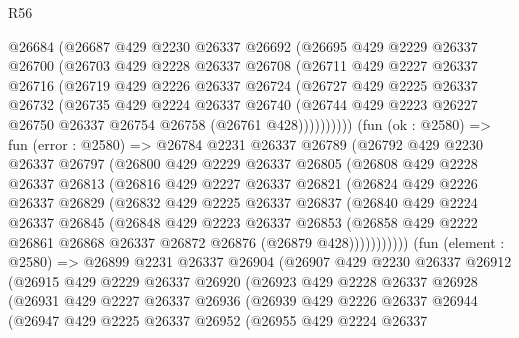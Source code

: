 \begin{lexlean}{R56}
\begin{coremodule}
      @26684
      (@26687
        @429
        @2230
        @26337
        @26692
        (@26695
          @429
          @2229
          @26337
          @26700
          (@26703
            @429
            @2228
            @26337
            @26708
            (@26711
              @429
              @2227
              @26337
              @26716
              (@26719
                @429
                @2226
                @26337
                @26724
                (@26727
                  @429
                  @2225
                  @26337
                  @26732
                  (@26735
                    @429
                    @2224
                    @26337
                    @26740
                    (@26744 @429 @2223 @26227 @26750 @26337 @26754 @26758 (@26761 @428))))))))))
    (fun (ok : @2580) =>
    fun (error : @2580) =>
    @26784
      @2231
      @26337
      @26789
      (@26792
        @429
        @2230
        @26337
        @26797
        (@26800
          @429
          @2229
          @26337
          @26805
          (@26808
            @429
            @2228
            @26337
            @26813
            (@26816
              @429
              @2227
              @26337
              @26821
              (@26824
                @429
                @2226
                @26337
                @26829
                (@26832
                  @429
                  @2225
                  @26337
                  @26837
                  (@26840
                    @429
                    @2224
                    @26337
                    @26845
                    (@26848
                      @429
                      @2223
                      @26337
                      @26853
                      (@26858 @429 @2222 @26861 @26868 @26337 @26872 @26876 (@26879 @428)))))))))))
    (fun (element : @2580) =>
    @26899
      @2231
      @26337
      @26904
      (@26907
        @429
        @2230
        @26337
        @26912
        (@26915
          @429
          @2229
          @26337
          @26920
          (@26923
            @429
            @2228
            @26337
            @26928
            (@26931
              @429
              @2227
              @26337
              @26936
              (@26939
                @429
                @2226
                @26337
                @26944
                (@26947
                  @429
                  @2225
                  @26337
                  @26952
                  (@26955
                    @429
                    @2224
                    @26337

\end{coremodule}
\end{lexlean}
